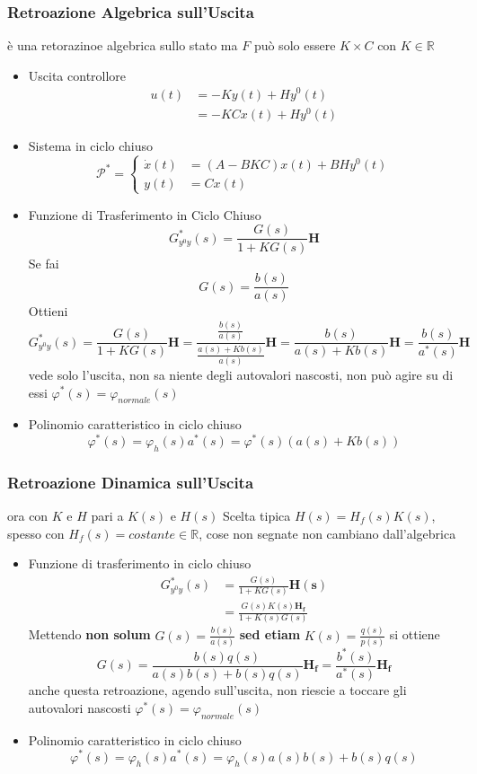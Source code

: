 \documentclass{article}
\begin{document}
\subsubsection{Retroazione Algebrica sull'Uscita}
è una retorazinoe algebrica sullo stato ma $F$ può solo essere
$K \times C$ con $K \in \mathbb{R}$
\begin{itemize}
\item Uscita controllore
  \begin{align*}
    u(t) &= -Ky(t) + H y^0 (t) \\
    &= -KCx(t) + Hy^0 (t)
  \end{align*}
\item Sistema in ciclo chiuso
  \[ \mathcal{P}^{\ast} = \begin{cases}
    \dot{x}(t) &= (A-BKC)x(t) + BHy^0 (t) \\
    y(t) &= Cx(t)
  \end{cases} \]
\item Funzione di Trasferimento in Ciclo Chiuso
  \[ G^{\ast} _{y^0 y} (s) = \frac{G(s)}{1+ KG(s)} \mathbf{H}\]
  Se fai
  \[ G(s) = \frac{b(s)}{a(s)} \]
  Ottieni
  \[ G^{\ast} _{y^0 y} (s)
  = \frac{G(s)}{1+KG(s)} \mathbf{H}
  = \frac{\frac{b(s)}{a(s)}}{\frac{a(s) + Kb(s)}{a(s)}} \mathbf{H}
  = \frac{b(s)}{a(s) + Kb(s)} \mathbf{H}
  = \frac{b(s)}{a^{\ast}(s)} \mathbf{H}\]
  vede solo l'uscita, non sa niente degli autovalori nascosti, non può agire su
  di essi
  $\varphi ^{\ast} (s) = \varphi_{normale} (s)$ \item Polinomio caratteristico in ciclo chiuso
  \[ \varphi ^{\ast} (s) = \varphi_{h} (s) a^{\ast} (s)
  = \varphi ^{\ast} (s) (a(s) + Kb(s)) \]
\end{itemize}

\subsubsection{Retroazione Dinamica sull'Uscita}
ora con $K$ e $H$ pari a $K(s)$ e $H(s)$
Scelta tipica $H(s) = H_f (s) K(s)$, spesso con
$H_f (s) = costante \in \mathbb{R}$, cose non segnate non cambiano
dall'algebrica

\begin{itemize}
\item Funzione di trasferimento in ciclo chiuso
  \begin{align*}
    G^{\ast} _{y^0 y}(s) &= \frac{G(s)}{1 + KG(s)} \mathbf{H(s)} \\
    &= \frac{G(s)K(s) \mathbf{H_f}}{1 + K(s)G(s)}
  \end{align*}
  Mettendo \textbf{non solum}
  $G(s) = \frac{b(s)}{a(s)}$ \textbf{sed etiam}
  $K(s) = \frac{q(s)}{p(s)}$ si ottiene
  \[ G(s) = \frac{b(s)q(s)}{a(s)b(s) + b(s)q(s)} \mathbf{H_f} =
  \frac{b^{\ast}(s)}{a^{\ast}(s)} \mathbf{H_f} \]
  anche questa retroazione, agendo sull'uscita, non riescie a toccare gli
  autovalori nascosti
  $\varphi ^{\ast} (s) = \varphi_{normale} (s)$
\item Polinomio caratteristico in ciclo chiuso
  \[ \varphi ^{\ast} (s) = \varphi_h (s) a^{\ast} (s)
  = \varphi _h (s) a(s)b(s) + b(s)q(s) \]
\end{itemize}
\end{document}

